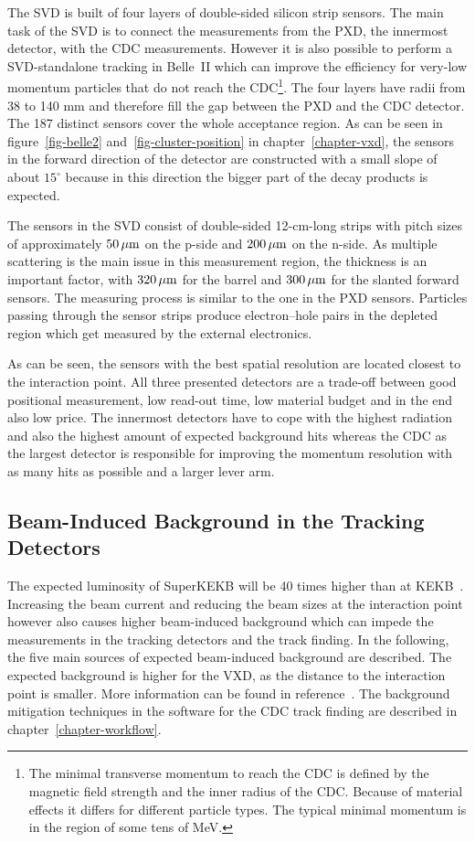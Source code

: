 The SVD is built of four layers of double-sided silicon strip sensors. The main task of the SVD is to connect the measurements from the PXD, the innermost detector, with the CDC measurements. However it is also possible to perform a SVD-standalone tracking in Belle~II which can improve the efficiency for very-low momentum particles that do not reach the CDC\footnote{The minimal transverse momentum to reach the CDC is defined by the magnetic field strength and the inner radius of the CDC. Because of material effects it differs for different particle types. The typical minimal momentum is in the region of some tens of MeV.}. The four layers have radii from 38 to 140 mm and therefore fill the gap between the PXD and the CDC detector. The 187 distinct sensors cover the whole acceptance region. As can be seen in figure~\ref{fig-belle2} and~\ref{fig-cluster-position} in chapter~\ref{chapter-vxd}, the sensors in the forward direction of the detector are constructed with a small slope of about $15^\circ$ because in this direction the bigger part of the decay products is expected. 

The sensors in the SVD consist of double-sided 12-cm-long strips with pitch sizes of approximately $\unit[50]{\mu m}$ on the p-side and $\unit[200]{\mu m}$ on the n-side. As multiple scattering is the main issue in this measurement region, the thickness is an important factor, with $\unit[320]{\mu m}$ for the barrel and $\unit[300]{\mu m}$ for the slanted forward sensors. The measuring process is similar to the one in the PXD sensors. Particles passing through the sensor strips produce electron--hole pairs in the depleted region which get measured by the external electronics. 

As can be seen, the sensors with the best spatial resolution are located closest to the interaction point. All three presented detectors are a trade-off between good positional measurement, low read-out time, low material budget and in the end also low price. The innermost detectors have to cope with the highest radiation and also the highest amount of expected background hits whereas the CDC as the largest detector is responsible for improving the momentum resolution with as many hits as possible and a larger lever arm.

\subsection{Beam-Induced Background in the Tracking Detectors}

The expected luminosity of SuperKEKB will be 40 times higher than at KEKB~\cite{tdr}. Increasing the beam current and reducing the beam sizes at the interaction point however also causes higher beam-induced background which can impede the measurements in the tracking detectors and the track finding. In the following, the five main sources of expected beam-induced background are described. The expected background is higher for the VXD, as the distance to the interaction point is smaller. More information can be found in reference~\cite{jakob}. The background mitigation techniques in the software for the CDC track finding are described in chapter~\ref{chapter-workflow}.

